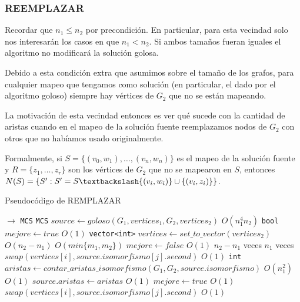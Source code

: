 \subsubsection{REEMPLAZAR}
Recordar que $n_1 \leq n_2$ por precondición. En particular, para esta vecindad solo nos interesarán los casos en que $n_1 < n_2$. Si ambos tamaños fueran iguales el algoritmo no modificará la solución golosa.

Debido a esta condición extra que asumimos sobre el tamaño de los grafos, para cualquier mapeo que tengamos como solución (en particular, el dado por el algoritmo goloso) siempre hay vértices de $G_2$ que no se están mapeando.

La motivación de esta vecindad entonces es ver qué sucede con la cantidad de aristas cuando en el mapeo de la solución fuente reemplazamos nodos de $G_2$ con otros que no habíamos usado originalmente.

Formalmente, si $S = \{(v_0, w_{1}),\hdots , (v_n, w_{n})\}$ es el mapeo de la solución fuente y $R = \{z_1, \hdots, z_r\}$ son los vértices de $G_2$ que no se mapearon en $S$, entonces \\
$N(S) = \{S': S' = S \textbackslash \{(v_i, w_i)\} \cup \{(v_i, z_i)\}\}$. 

\begin{algorithm}[H]
  \small
  \begin{algorithmic}[1]
  \caption{Pseudocódigo de REMPLAZAR}
  \label{algo:5-2}
    $\rightarrow$ \texttt{MCS}
      \State \texttt{MCS} $source \gets goloso(G_1, vertices_1, G_2, vertices_2)$
      \Comment $O(n_1^4n_2)$
      \State \texttt{bool} $mejore \gets true$
      \Comment $O(1)$
      \State \texttt{vector<int>} $vertices \gets set\_to\_vector(vertices_2)$
      \Comment $O(n_2-n_1)$
      \Comment $O(min\{m_1, m_2\})$
        \State $mejore \gets false$
        \Comment $O(1)$
        \Comment $n_2-n_1$ veces
          \Comment $n_1$ veces
            \State $swap(vertices[i], source.isomorfismo[j].second)$
            \Comment $O(1)$
            \State \texttt{int} $aristas \gets contar\_aristas\_isomorfismo(G_1, G_2, source.isomorfismo)$
            \Comment $O(n_1^2)$
            \Comment $O(1)$
              \State $source.aristas \gets aristas$  
              \Comment $O(1)$            
              \State $mejore \gets true$
              \Comment $O(1)$
            \Else
              \State $swap(vertices[i], source.isomorfismo[j].second)$
              \Comment $O(1)$
            \EndIf
          \EndFor
        \EndFor
      \EndWhile
    \EndProcedure
  \end{algorithmic}
\end{algorithm}

